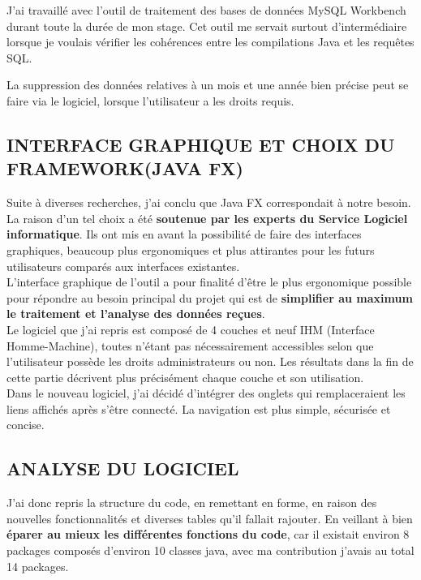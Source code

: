 J’ai travaillé avec l’outil de traitement des bases de données MySQL Workbench durant toute la durée de mon stage. Cet outil me servait surtout d’intermédiaire lorsque je voulais vérifier les cohérences entre les compilations Java et les requêtes SQL.

La suppression des données relatives à un mois et une année bien précise peut se faire via le logiciel, lorsque l’utilisateur a les droits requis. 

\subsection{INTERFACE GRAPHIQUE ET CHOIX DU FRAMEWORK(JAVA FX)}

Suite à diverses recherches, j’ai conclu que Java FX correspondait à notre besoin. La raison d’un tel choix a été \textbf{soutenue par les experts du Service Logiciel informatique}. Ils ont mis en avant la possibilité de faire des interfaces graphiques, beaucoup plus ergonomiques et plus attirantes pour les futurs utilisateurs comparés aux interfaces existantes.\\ 

L’interface graphique de l’outil a pour finalité d’être le plus ergonomique possible pour répondre au besoin principal du projet qui est de \textbf{simplifier au maximum le traitement et l’analyse des données reçues}.\\

Le logiciel que j’ai repris est composé de 4 couches et neuf IHM (Interface Homme-Machine), toutes n’étant pas nécessairement accessibles selon que l’utilisateur possède les droits administrateurs ou non. Les résultats dans la fin de cette partie décrivent plus précisément chaque couche et son utilisation.\\

Dans le nouveau logiciel, j’ai décidé d’intégrer des onglets qui remplaceraient les liens affichés après s’être connecté. La navigation est plus simple, sécurisée et concise. 

\subsection{ANALYSE DU LOGICIEL}
J’ai donc repris la structure du code, en remettant en forme, en raison des nouvelles fonctionnalités et diverses tables qu’il fallait rajouter. En veillant à bien \textbf{éparer au mieux les différentes fonctions du code}, car il existait environ 8 packages composés d’environ 10 classes java, avec ma contribution j’avais au total 14 packages.\\

